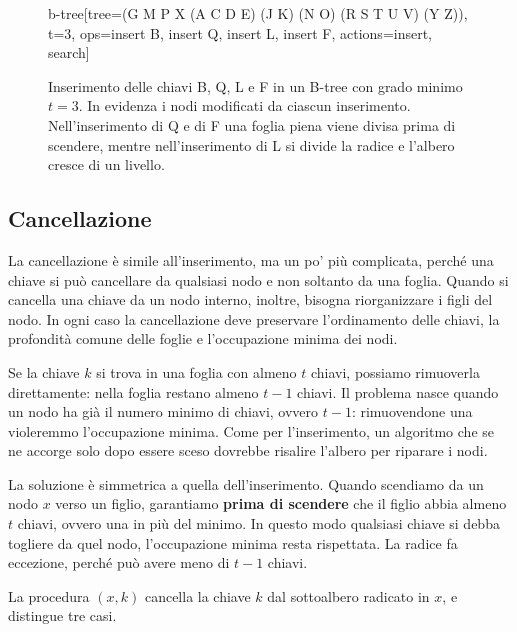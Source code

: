 \begin{figure}[htbp]
\begin{widget}{b-tree}[tree={(G M P X (A C D E) (J K) (N O) (R S T U V) (Y Z))}, t=3, ops={insert B, insert Q, insert L, insert F}, actions={insert, search}]
\end{widget}
\caption{Inserimento delle chiavi B, Q, L e F in un B-tree con grado minimo $t = 3$. In evidenza i nodi modificati da ciascun inserimento. Nell'inserimento di Q e di F una foglia piena viene divisa prima di scendere, mentre nell'inserimento di L si divide la radice e l'albero cresce di un livello.}
\label{fig:btree-insert}
\end{figure}

\subsection{Cancellazione}\label{sec:btree-delete}
La cancellazione è simile all'inserimento, ma un po' più complicata, perché una chiave si può cancellare da qualsiasi nodo e non soltanto da una foglia. Quando si cancella una chiave da un nodo interno, inoltre, bisogna riorganizzare i figli del nodo. In ogni caso la cancellazione deve preservare l'ordinamento delle chiavi, la profondità comune delle foglie e l'occupazione minima dei nodi.

Se la chiave $k$ si trova in una foglia con almeno $t$ chiavi, possiamo rimuoverla direttamente: nella foglia restano almeno $t - 1$ chiavi. Il problema nasce quando un nodo ha già il numero minimo di chiavi, ovvero $t - 1$: rimuovendone una violeremmo l'occupazione minima. Come per l'inserimento, un algoritmo che se ne accorge solo dopo essere sceso dovrebbe risalire l'albero per riparare i nodi.

La soluzione è simmetrica a quella dell'inserimento. Quando scendiamo da un nodo $x$ verso un figlio, garantiamo \textbf{prima di scendere} che il figlio abbia almeno $t$ chiavi, ovvero una in più del minimo. In questo modo qualsiasi chiave si debba togliere da quel nodo, l'occupazione minima resta rispettata. La radice fa eccezione, perché può avere meno di $t-1$ chiavi.

La procedura \BTreeDelete$(x,k)$ cancella la chiave $k$ dal sottoalbero radicato in $x$, e distingue tre casi.


